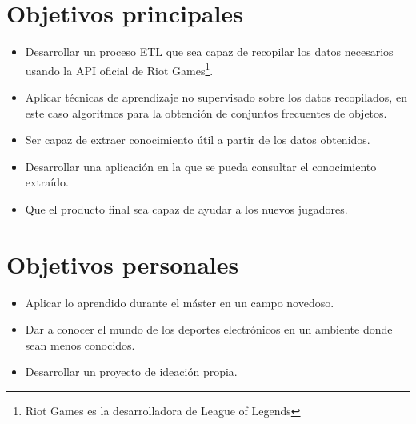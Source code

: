 
\section{Objetivos principales}
\begin{itemize}
    \item Desarrollar un proceso ETL que sea capaz de recopilar los datos necesarios usando la API oficial de Riot Games\footnote{Riot Games es la desarrolladora de League of Legends}.
    \item Aplicar técnicas de aprendizaje no supervisado sobre los datos recopilados, en este caso algoritmos para la obtención de conjuntos frecuentes de objetos.
    \item Ser capaz de extraer conocimiento útil a partir de los datos obtenidos.
    \item Desarrollar una aplicación en la que se pueda consultar el conocimiento extraído.
    \item Que el producto final sea capaz de ayudar a los nuevos jugadores.
\end{itemize}


\section{Objetivos personales}
\begin{itemize}
    \item Aplicar lo aprendido durante el máster en un campo novedoso.
    \item Dar a conocer el mundo de los deportes electrónicos en un ambiente donde sean menos conocidos.
    \item Desarrollar un proyecto de ideación propia.
\end{itemize}